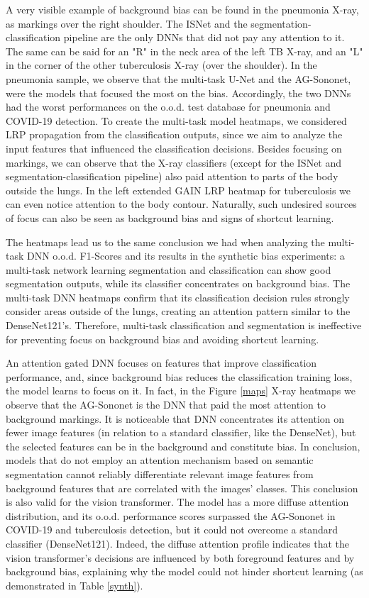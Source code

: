 \documentclass[fleqn,10pt]{wlscirep}
\begin{document}
{A very visible example of background bias can be found in the pneumonia X-ray, as markings over the right shoulder. The ISNet and the segmentation-classification pipeline are the only DNNs that did not pay any attention to it. The same can be said for an "R" in the neck area of the left TB X-ray, and an "L" in the corner of the other tuberculosis X-ray (over the shoulder). In the pneumonia sample, we observe that the multi-task U-Net and the AG-Sononet, were the models that focused the most on the bias. Accordingly, the two DNNs had the worst performances on the o.o.d. test database for pneumonia and COVID-19 detection. To create the multi-task model heatmaps, we considered LRP propagation from the classification outputs, since we aim to analyze the input features that influenced the classification decisions. Besides focusing on markings, we can observe that the X-ray classifiers (except for the ISNet and segmentation-classification pipeline) also paid attention to parts of the body outside the lungs. In the left extended GAIN LRP heatmap for tuberculosis we can even notice attention to the body contour. Naturally, such undesired sources of focus can also be seen as background bias and signs of shortcut learning.

The heatmaps lead us to the same conclusion we had when analyzing the multi-task DNN o.o.d. F1-Scores and its results in the synthetic bias experiments: a multi-task network learning segmentation and classification can show good segmentation outputs, while its classifier concentrates on background bias. The multi-task DNN heatmaps confirm that its classification decision rules strongly consider areas outside of the lungs, creating an attention pattern similar to the DenseNet121's. Therefore, multi-task classification and segmentation is ineffective for preventing focus on background bias and avoiding shortcut learning.

An attention gated DNN focuses on features that improve classification performance, and, since background bias reduces the classification training loss, the model learns to focus on it. In fact, in the Figure \ref{maps} X-ray heatmaps we observe that the AG-Sononet is the DNN that paid the most attention to background markings. It is noticeable that DNN concentrates its attention on fewer image features (in relation to a standard classifier, like the DenseNet), but the selected features can be in the background and constitute bias. In conclusion, models that do not employ an attention mechanism based on semantic segmentation cannot reliably differentiate relevant image features from background features that are correlated with the images' classes. This conclusion is also valid for the vision transformer. The model has a more diffuse attention distribution, and its o.o.d. performance scores surpassed the AG-Sononet in COVID-19 and tuberculosis detection, but it could not overcome a standard classifier (DenseNet121). Indeed, the diffuse attention profile indicates that the vision transformer's decisions are influenced by both foreground features and by background bias, explaining why the model could not hinder shortcut learning (as demonstrated in Table \ref{synth}).

}
\end{document}

